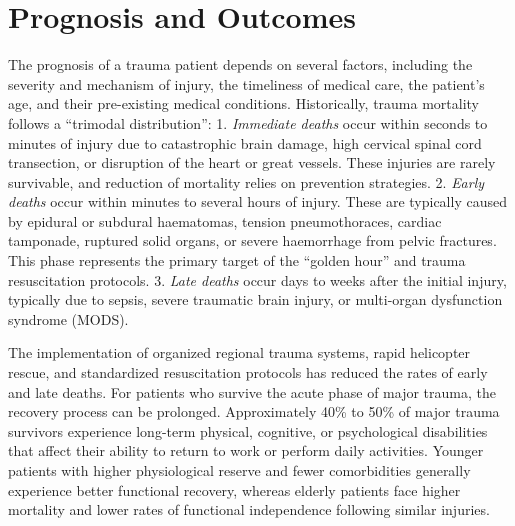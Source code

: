 \section*{Prognosis and Outcomes}
The prognosis of a trauma patient depends on several factors, including the severity and mechanism of injury, the timeliness of medical care, the patient's age, and their pre-existing medical conditions. Historically, trauma mortality follows a ``trimodal distribution'':
1. \textit{Immediate deaths} occur within seconds to minutes of injury due to catastrophic brain damage, high cervical spinal cord transection, or disruption of the heart or great vessels. These injuries are rarely survivable, and reduction of mortality relies on prevention strategies.
2. \textit{Early deaths} occur within minutes to several hours of injury. These are typically caused by epidural or subdural haematomas, tension pneumothoraces, cardiac tamponade, ruptured solid organs, or severe haemorrhage from pelvic fractures. This phase represents the primary target of the ``golden hour'' and trauma resuscitation protocols.
3. \textit{Late deaths} occur days to weeks after the initial injury, typically due to sepsis, severe traumatic brain injury, or multi-organ dysfunction syndrome (MODS).

The implementation of organized regional trauma systems, rapid helicopter rescue, and standardized resuscitation protocols has reduced the rates of early and late deaths. For patients who survive the acute phase of major trauma, the recovery process can be prolonged. Approximately 40\% to 50\% of major trauma survivors experience long-term physical, cognitive, or psychological disabilities that affect their ability to return to work or perform daily activities. Younger patients with higher physiological reserve and fewer comorbidities generally experience better functional recovery, whereas elderly patients face higher mortality and lower rates of functional independence following similar injuries.

